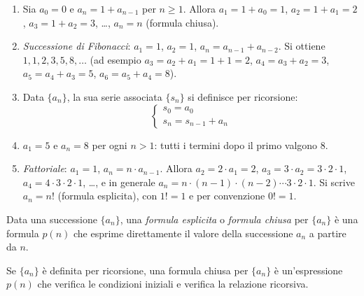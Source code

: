 \documentclass[11pt,a4paper]{article}
\begin{document}
\begin{esempio}
\begin{enumerate}
    \item Sia $a_0 = 0$ e $a_n = 1 + a_{n-1}$ per $n \geq 1$. Allora
          $a_1 = 1 + a_0 = 1$, $a_2 = 1 + a_1 = 2$, $a_3 = 1 + a_2 = 3$, \dots,
          $a_n = n$ (formula chiusa).
    \item \emph{Successione di Fibonacci}: $a_1 = 1$, $a_2 = 1$,
          $a_n = a_{n-1} + a_{n-2}$. Si ottiene $1, 1, 2, 3, 5, 8, \dots$
          (ad esempio $a_3 = a_2 + a_1 = 1 + 1 = 2$, $a_4 = a_3 + a_2 = 3$,
          $a_5 = a_4 + a_3 = 5$, $a_6 = a_5 + a_4 = 8$).
    \item Data $\{a_n\}$, la sua serie associata $\{s_n\}$ si definisce per
          ricorsione:
          \[
            \begin{cases}
              s_0 = a_0\\
              s_n = s_{n-1} + a_n
            \end{cases}
          \]
    \item $a_1 = 5$ e $a_n = 8$ per ogni $n > 1$: tutti i termini dopo il primo
          valgono $8$.
    \item \emph{Fattoriale}: $a_1 = 1$, $a_n = n \cdot a_{n-1}$. Allora
          $a_2 = 2 \cdot a_1 = 2$, $a_3 = 3 \cdot a_2 = 3 \cdot 2 \cdot 1$,
          $a_4 = 4 \cdot 3 \cdot 2 \cdot 1$, \dots, e in generale
          $a_n = n \cdot (n-1) \cdot (n-2) \cdots 3 \cdot 2 \cdot 1$.
          Si scrive $a_n = n!$ (formula esplicita), con $1! = 1$ e per
          convenzione $0! = 1$.
\end{enumerate}
\end{esempio}

\begin{definizione}
Data una successione $\{a_n\}$, una \emph{formula esplicita} o
\emph{formula chiusa} per $\{a_n\}$ è una formula $p(n)$ che esprime
direttamente il valore della successione $a_n$ a partire da $n$.

Se $\{a_n\}$ è definita per ricorsione, una formula chiusa per $\{a_n\}$ è
un'espressione $p(n)$ che verifica le condizioni iniziali e verifica la
relazione ricorsiva.
\end{definizione}
\end{document}
